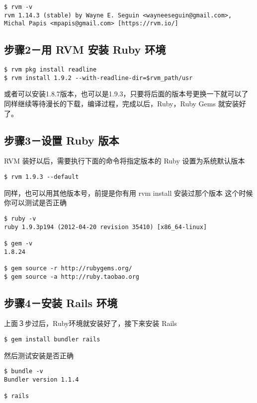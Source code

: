 \documentclass[11pt]{article}
\begin{document}
\begin{verbatim}
$ rvm -v
rvm 1.14.3 (stable) by Wayne E. Seguin <wayneeseguin@gmail.com>, Michal Papis <mpapis@gmail.com> [https://rvm.io/]
\end{verbatim}
\subsection{步骤2－用 RVM 安装 Ruby 环境}
\label{sec-1-3}


\begin{verbatim}
$ rvm pkg install readline
$ rvm install 1.9.2 --with-readline-dir=$rvm_path/usr
\end{verbatim}
或者可以安装1.8.7版本，也可以是1.9.3，只要将后面的版本号更换一下就可以了
同样继续等待漫长的下载，编译过程，完成以后，Ruby，Ruby Gems 就安装好了。
\subsection{步骤3－设置 Ruby 版本}
\label{sec-1-4}

RVM 装好以后，需要执行下面的命令将指定版本的 Ruby 设置为系统默认版本

\begin{verbatim}
$ rvm 1.9.3 --default
\end{verbatim}
同样，也可以用其他版本号，前提是你有用 rvm install 安装过那个版本
这个时候你可以测试是否正确

\begin{verbatim}
$ ruby -v
ruby 1.9.3p194 (2012-04-20 revision 35410) [x86_64-linux]

$ gem -v
1.8.24

$ gem source -r http://rubygems.org/
$ gem source -a http://ruby.taobao.org
\end{verbatim}
\subsection{步骤4－安装 Rails 环境}
\label{sec-1-5}

上面３步过后，Ruby环境就安装好了，接下来安装 Rails

\begin{verbatim}
$ gem install bundler rails
\end{verbatim}
然后测试安装是否正确

\begin{verbatim}
$ bundle -v
Bundler version 1.1.4

$ rails
\end{verbatim}
\end{document}
